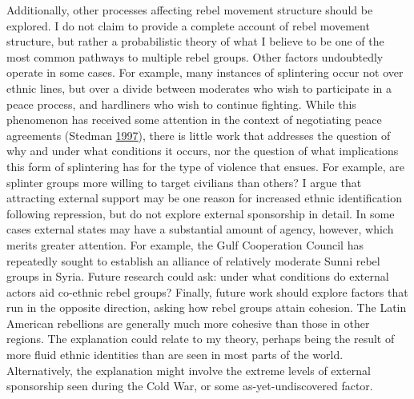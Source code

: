 \documentclass[12pt,]{book}
\theoremstyle{definition}
\theoremstyle{definition}
\theoremstyle{definition}
\theoremstyle{remark}
\begin{document}
Additionally, other processes affecting rebel movement structure should
be explored. I do not claim to provide a complete account of rebel
movement structure, but rather a probabilistic theory of what I believe
to be one of the most common pathways to multiple rebel groups. Other
factors undoubtedly operate in some cases. For example, many instances
of splintering occur not over ethnic lines, but over a divide between
moderates who wish to participate in a peace process, and hardliners who
wish to continue fighting. While this phenomenon has received some
attention in the context of negotiating peace agreements (Stedman
\protect\hyperlink{ref-Stedman1997}{1997}), there is little work that
addresses the question of why and under what conditions it occurs, nor
the question of what implications this form of splintering has for the
type of violence that ensues. For example, are splinter groups more
willing to target civilians than others? I argue that attracting
external support may be one reason for increased ethnic identification
following repression, but do not explore external sponsorship in detail.
In some cases external states may have a substantial amount of agency,
however, which merits greater attention. For example, the Gulf
Cooperation Council has repeatedly sought to establish an alliance of
relatively moderate Sunni rebel groups in Syria. Future research could
ask: under what conditions do external actors aid co-ethnic rebel
groups? Finally, future work should explore factors that run in the
opposite direction, asking how rebel groups attain cohesion. The Latin
American rebellions are generally much more cohesive than those in other
regions. The explanation could relate to my theory, perhaps being the
result of more fluid ethnic identities than are seen in most parts of
the world. Alternatively, the explanation might involve the extreme
levels of external sponsorship seen during the Cold War, or some
as-yet-undiscovered factor.
\end{document}

